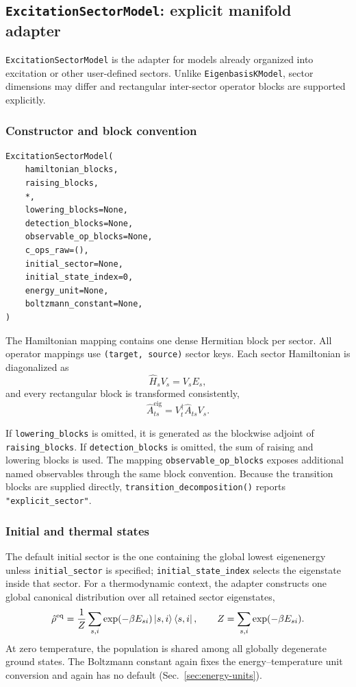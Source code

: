 \documentclass[11pt]{article}
\begin{document}
\subsection{\texttt{ExcitationSectorModel}: explicit manifold adapter}

\noindent \texttt{ExcitationSectorModel} is the adapter for models already organized into excitation or other user-defined sectors. Unlike \texttt{EigenbasisKModel}, sector dimensions may differ and rectangular inter-sector operator blocks are supported explicitly.

\subsubsection{Constructor and block convention}

\begin{verbatim}
ExcitationSectorModel(
    hamiltonian_blocks,
    raising_blocks,
    *,
    lowering_blocks=None,
    detection_blocks=None,
    observable_op_blocks=None,
    c_ops_raw=(),
    initial_sector=None,
    initial_state_index=0,
    energy_unit=None,
    boltzmann_constant=None,
)
\end{verbatim}
The Hamiltonian mapping contains one dense Hermitian block per sector. All operator mappings use \texttt{(target, source)} sector keys. Each sector Hamiltonian is diagonalized as
\begin{equation}
    \hat{H}_s V_s=V_s E_s,
\end{equation}
and every rectangular block is transformed consistently,
\begin{equation}
    \hat{A}_{ts}^{\mathrm{eig}}=V_t^\dagger \hat{A}_{ts}V_s.
\end{equation}

If \texttt{lowering\_blocks} is omitted, it is generated as the blockwise adjoint of \texttt{raising\_blocks}. If \texttt{detection\_blocks} is omitted, the sum of raising and lowering blocks is used. The mapping \texttt{observable\_op\_blocks} exposes additional named observables through the same block convention. Because the transition blocks are supplied directly, \texttt{transition\_decomposition()} reports \texttt{"explicit\_sector"}.

\subsubsection{Initial and thermal states}

The default initial sector is the one containing the global lowest eigenenergy unless \texttt{initial\_sector} is specified; \texttt{initial\_state\_index} selects the eigenstate inside that sector. For a thermodynamic context, the adapter constructs one global canonical distribution over all retained sector eigenstates,
\begin{equation}
    \hat{\rho}^{\mathrm{eq}}=
    \frac{1}{Z}\sum_{s,i}\exp(-\beta E_{si})
    \ket{s,i}\bra{s,i},
    \qquad Z=\sum_{s,i}\exp(-\beta E_{si}).
\end{equation}
At zero temperature, the population is shared among all globally degenerate ground states. The Boltzmann constant again fixes the energy--temperature unit conversion and again has no default (Sec.~\ref{sec:energy-units}).
\end{document}

